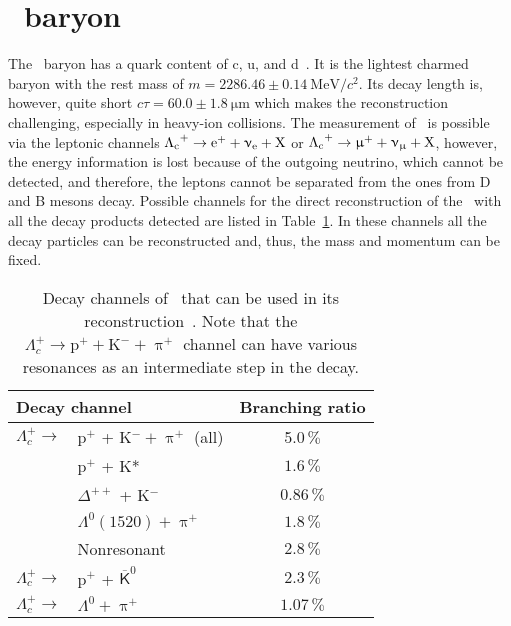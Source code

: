 \nocite{Langevin,LangevinTranslation}



\section{\Lambdac\ baryon}

The \Lambdac\ baryon has a quark content of c, u, and d~\cite{PDG}. It is the lightest charmed baryon with the rest mass of $m = 2286.46 \pm \SI{0.14}{\mega\electronvolt}/c^2$\@. Its decay length is, however, quite short $c\tau = 60.0 \pm \SI{1.8}{\micro\metre}$ which makes the reconstruction challenging, especially in heavy-ion collisions. The measurement of \Lambdac\ is possible via the leptonic channels ${\Lambda_\text{c}}^+ \rightarrow \mathrm{e}^+ + \upnu_\mathrm{e} + \mathrm{X}$ or ${\Lambda_\text{c}}^+ \rightarrow \upmu^+ + \upnu_\upmu + \mathrm{X}$, however, the energy information is lost because of the outgoing neutrino, which cannot be detected, and therefore, the leptons cannot be separated from the ones from D and B mesons decay. Possible channels for the direct reconstruction of the \Lambdac\ with all the decay products detected are listed in Table~\ref{tab:lcDecayCahnnels}. In these channels all the decay particles can be reconstructed and, thus, the mass and momentum can be fixed.

\begin{table}[htb]
\caption[Decay channels of \Lambdac\ that can be used in its reconstruction.]{\label{tab:lcDecayCahnnels}Decay channels of \Lambdac\ that can be used in its reconstruction~\cite{PDG}. Note that the $\Lambda_c^+ \rightarrow \mathrm{p}^+ + \mathrm{K}^- + \uppi^+$ channel can have various resonances as an intermediate step in the decay.}
\begin{center}
\begin{tabular}{llc}
\toprule
\multicolumn{2}{l}{Decay channel} & Branching ratio  \\
\midrule
$\Lambda_c^+ \rightarrow$ &  p$^+$ + K$^- + \uppi^+$ (all) & 5.0$\,\%$ \\
  & p$^+$ + K* & $1.6\,\%$ \\
  & $\Delta^{++}$ + K$^-$ & $0.86\,\%$ \\
  & $\Lambda^0(1520) + \uppi^+$ & $1.8\,\%$ \\
  & Nonresonant & $2.8\,\%$ \\
$\Lambda_c^+ \rightarrow$ &  p$^+$ + $\overline{\mathsf{K}}^0$ & $2.3\,\% $ \\
$\Lambda_c^+ \rightarrow$ & $ \Lambda^0 + \uppi^+$ & $1.07\,\%$ \\
\bottomrule
\end{tabular}
\end{center}
\end{table}




